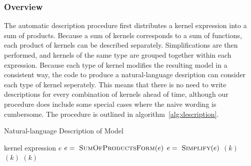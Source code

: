 \documentclass{article}
\begin{document}
\subsubsection{Overview}

The automatic description procedure first distributes a kernel expression into a sum of products.
Because a sum of kernels corresponds to a sum of functions, each product of kernels can be described separately.
Simplifications are then performed, and kernels of the same type are grouped together within each expression.
Because each type of kernel modifies the resulting model in a consistent way, the code to produce a natural-language desription can consider each type of kernel seperately.  This means that there is no need to write descriptions for every combination of kernels ahead of time, although our procedure does include some special cases where the naive wording is cumbersome.
The procedure is outlined in algorithm~\ref{alg:description}.




\begin{algorithm}[tb]
   \caption{Natural-language Description of Model}
   \label{alg:description}
\begin{algorithmic}
    kernel expression $e$
   \STATE $e = {\textnormal{ \sc SumOfProductsForm}}(e)$
   \STATE $e = {\textnormal{ \sc Simplify}}(e)$
    $(k)$
    $(k)$
    $(k)$
   \ENDFOR
\end{algorithmic}
\end{algorithm}
\end{document}

